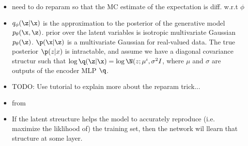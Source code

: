 \begin{itemize}
    \item need to do reparam so that the  MC estimate of the expectation is diff. w.r.t $\phi$
    \item $q_{\phi} (\z|\x)$ is the approximation to the posterior of the generative model $p_{\theta}(\x, \z)$. prior over the latent variables is isotropic multivariate Gaussian $p_{\theta}(\z)$. $\p(\x|\z)$ is a multivariate Gaussian for real-valued data. The true posterior $\p(z|x)$ is intractable, and assume we have a diagonal covariance structur such that $\log \q (\z|\x) = \log \N(z;\mu^i, \sigma^2 I$, where $\mu$ and $\sigma$ are outputs of the encoder MLP $\q$. 
    \item TODO: Use tutorial to explain more about the reparam trick...
\end{itemize}

\begin{itemize}
    \item from \cite{Doersch}
    \item If the latent streucture helps the model to accurately reproduce  (i.e. maximize the liklihood of) the training set, then the network wil llearn that structure at some layer. 
\end{itemize}

